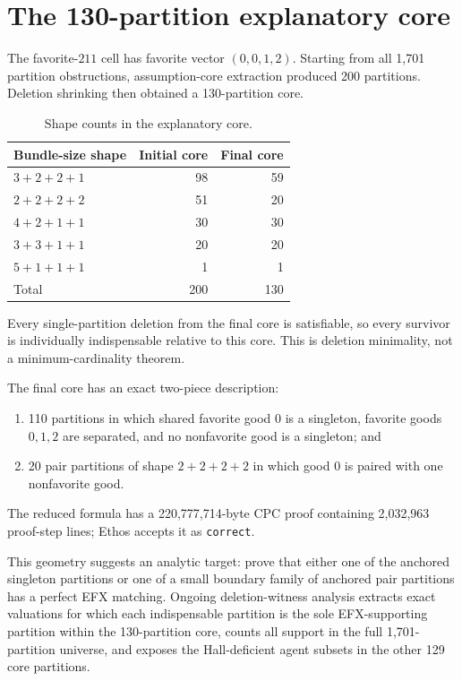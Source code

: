 \documentclass[11pt]{article}
\theoremstyle{definition}
\begin{document}
\section{The 130-partition explanatory core}

The favorite-$211$ cell has favorite vector $(0,0,1,2)$. Starting from all
1,701 partition obstructions, assumption-core extraction produced 200
partitions. Deletion shrinking then obtained a 130-partition core.

\begin{table}[ht]
\centering
\begin{tabular}{@{}lrr@{}}
\toprule
Bundle-size shape & Initial core & Final core\\
\midrule
$3+2+2+1$ & 98 & 59\\
$2+2+2+2$ & 51 & 20\\
$4+2+1+1$ & 30 & 30\\
$3+3+1+1$ & 20 & 20\\
$5+1+1+1$ & 1 & 1\\
\midrule
Total & 200 & 130\\
\bottomrule
\end{tabular}
\caption{Shape counts in the explanatory core.}
\end{table}

Every single-partition deletion from the final core is satisfiable, so every
survivor is individually indispensable relative to this core. This is
deletion minimality, not a minimum-cardinality theorem.

The final core has an exact two-piece description:
\begin{enumerate}[leftmargin=2.1em]
  \item 110 partitions in which shared favorite good $0$ is a singleton,
  favorite goods $0,1,2$ are separated, and no nonfavorite good is a
  singleton; and
  \item 20 pair partitions of shape $2+2+2+2$ in which good $0$ is paired
  with one nonfavorite good.
\end{enumerate}
The reduced formula has a 220,777,714-byte CPC proof containing 2,032,963
proof-step lines; Ethos accepts it as \texttt{correct}.

This geometry suggests an analytic target: prove that either one of the
anchored singleton partitions or one of a small boundary family of anchored
pair partitions has a perfect EFX matching. Ongoing deletion-witness analysis
extracts exact valuations for which each indispensable partition is the sole
EFX-supporting partition within the 130-partition core, counts all support in
the full 1,701-partition universe, and exposes the Hall-deficient agent subsets
in the other 129 core partitions.
\end{document}
